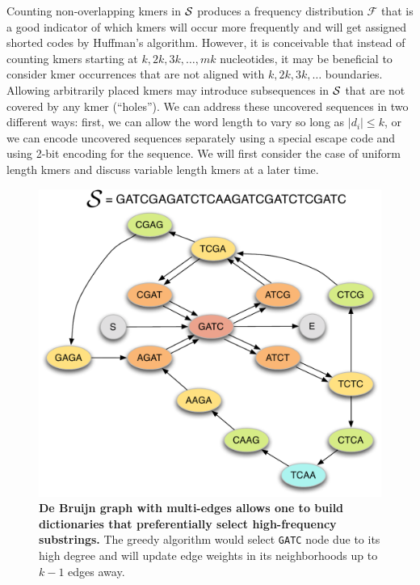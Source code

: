 \documentclass[12pt]{cmuthesis}
\begin{document}
  Counting non-overlapping kmers in $\mathcal{S}$ produces a frequency distribution $\mathcal{F}$ that is a good indicator of which kmers will occur more frequently and will get assigned shorted codes by Huffman's algorithm. However, it is conceivable that instead of counting kmers starting at $k, 2k, 3k, \ldots, mk$ nucleotides, it may be beneficial to consider kmer occurrences that are not aligned with $k, 2k, 3k, \ldots$ boundaries. Allowing arbitrarily placed kmers may introduce subsequences in $\mathcal{S}$ that are not covered by any kmer (``holes''). We can address these uncovered sequences in two different ways: first, we can allow the word length to vary so long as $|d_i| \leq k$, or we can encode uncovered sequences separately using a special escape code and using 2-bit encoding for the sequence. We will first consider the case of uniform length kmers and discuss variable length kmers at a later time.

  \begin{figure}[ht]
    \centering
    \includegraphics[width=0.7\linewidth]{figures/huffmer_node_neighborhoods}
    \caption{\textbf{De Bruijn graph with multi-edges allows one to build dictionaries that preferentially select high-frequency substrings.} The greedy algorithm would select \texttt{GATC} node due to its high degree and will update edge weights in its neighborhoods up to $k-1$ edges away.}
    \label{fig:denovo:debruijn}
  \end{figure}
\end{document}
